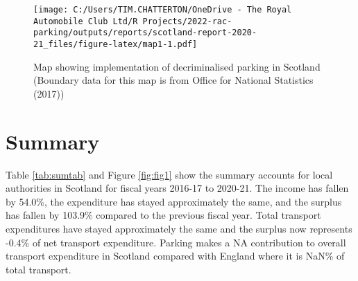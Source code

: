 \documentclass[
  12pt,
]{article}
\begin{document}
\begin{figure}
\centering
\texttt{[image: C:/Users/TIM.CHATTERTON/OneDrive - The Royal Automobile Club Ltd/R Projects/2022-rac-parking/outputs/reports/scotland-report-2020-21\_files/figure-latex/map1-1.pdf]}
\caption{\label{fig:map1}Map showing implementation of decriminalised parking in Scotland (Boundary data for this map is from Office for National Statistics (2017))}
\end{figure}

\hypertarget{summary}{%
\section{Summary}\label{summary}}

Table \ref{tab:sumtab} and Figure \ref{fig:fig1} show the summary accounts for local authorities in Scotland for fiscal years 2016-17 to 2020-21. The income has
fallen by 54.0\%, the expenditure has
stayed approximately the same, and the surplus has
fallen by 103.9\%
compared to the previous fiscal year. Total transport expenditures have
stayed approximately the same and the surplus now represents -0.4\% of net transport expenditure. Parking makes a
NA contribution to overall transport expenditure in Scotland compared with England where it is NaN\% of total transport.

\newpage

\begingroup\fontsize{10}{12}\selectfont
\end{document}
